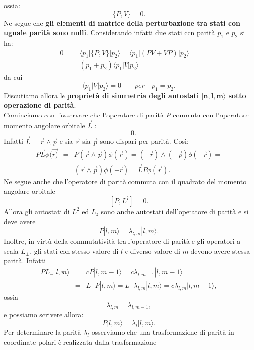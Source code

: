 ossia:
\begin{equation} 
\{P,V\}=0.
\end{equation}
Ne segue che \textbf{gli elementi di matrice della perturbazione tra stati con uguale parità sono nulli}. Considerando infatti due stati con parità $p_1$ e $p_2$ si ha:
\begin{eqnarray}
0 & = &\langle p_1 | \{ P,V \} |p_2\rangle= \langle p_1 | \left( PV+VP \right) |p_2 \rangle = \nonumber \\
 & =& (p_1+p_2)\langle p_1|V|p_2\rangle 
\end{eqnarray}
da cui 
\begin{equation} \label{eq:cap23_2}
\langle p_1| V |p_2\rangle=0 \qquad per \quad p_1=p_2.
\end{equation}
Discutiamo allora le \textbf{proprietà di simmetria degli autostati $\boldsymbol{|n,l,m \rangle}$ sotto operazione di parità}.\\
Cominciamo con l'osservare che l'operatore di parità $P$ commuta con l'operatore momento angolare orbitale $\vec{L}$ :
\begin{equation}
[ P, \vec{L} ]=0.
\end{equation}
Infatti $\vec{L}=\vec{r}\wedge \vec{p}$ e sia $\vec{r}$ sia $\vec{p}$ sono dispari per parità. Così:
\begin{eqnarray}
P\vec{L}\phi(\vec{r)} & = & P(\vec{r}\wedge\vec{p})\phi(\vec{r})= (\vec{-r}) \wedge (\vec{-p})\phi(\vec{-r})= \nonumber \\
& = & (\vec{r} \wedge \vec{p})\phi(\vec{-r})=\vec{L}P\phi(\vec{r}).
\end{eqnarray}
Ne segue anche che l'operatore di parità commuta con il quadrato del momento angolare orbitale
\begin{equation}
\left[ P,L^2\right]=0.
\end{equation}
Allora gli autostati di $L^2$ ed $L_z$ sono anche autostati dell'operatore di parità e si deve avere
\begin{equation}
P|l,m\rangle=\lambda_{l,m}|l,m\rangle.
\end{equation}
Inoltre, in virtù della commutatività tra l'operatore di parità e gli operatori a scala $L_{\pm}$, gli stati con stesso valore di $l$ e diverso valore di $m$ devono avere stessa parità. Infatti
\begin{eqnarray} 
 PL_-|l,m\rangle &= & cP|l,m-1\rangle=c\lambda_{l,m-1}|l,m-1\rangle=  \nonumber \\
&= & L_-P|l,m\rangle=L_- \lambda_{l,m}|l,m\rangle=c\lambda_{l,m}|l,m-1\rangle ,
\end{eqnarray}
ossia
\begin{equation} 
\lambda_{l,m}=\lambda_{l,m-1},
\end{equation}
e possiamo scrivere allora:
\begin{equation} 
P|l,m\rangle=\lambda_l|l,m \rangle.
\end{equation}
Per determinare la parità $\lambda_l$ osserviamo che una trasformazione di parità in coordinate polari è realizzata dalla trasformazione 

